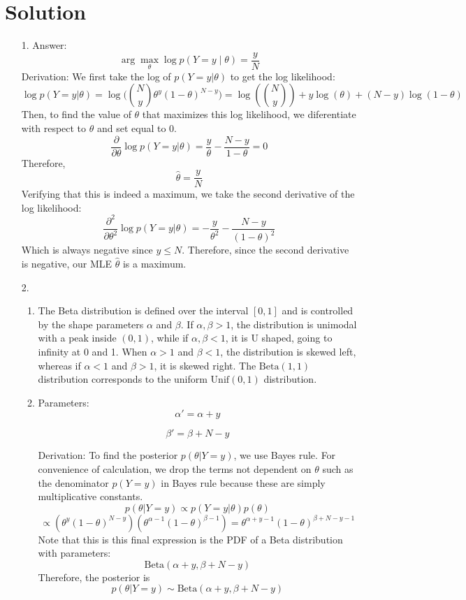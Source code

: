 \documentclass[submit]{../harvardml}
\newenvironment{answer}
  {\section*{Solution}}
{}
\begin{document}
\begin{answer}
  \begin{enumerate}
    \item[1.]
      Answer:
      \[
        \arg \max_{\theta} \log p(Y = y \mid \theta) = \frac{y}{N}
      \]
      Derivation: We first take the log of $p(Y = y | \theta)$ to get the log likelihood:
      $$\log p(Y = y | \theta) = \log\biggr({N \choose y} \theta^{y} (1-\theta)^{N-y}\biggr) = \log({N \choose y}) + y \log(\theta) + (N - y) \log ( 1- \theta)$$
      Then, to find the value of $\theta$ that maximizes this log likelihood, we diferentiate with respect to $\theta$ and set equal to $0$.
      $$\frac{\partial}{\partial \theta} \log p(Y = y | \theta) = \frac{y}{\theta} - \frac{N-y}{1-\theta} = 0$$
      Therefore, 
      $$\hat\theta = \frac{y}{N}$$
      Verifying that this is indeed a maximum, we take the second derivative of the log likelihood:
      $$\frac{\partial^2}{\partial \theta^2} \log p(Y = y | \theta) = -\frac{y}{\theta^2} - \frac{N-y}{(1-\theta)^2}$$
      Which is always negative since $y \leq N$. Therefore, since the second derivative is negative, our MLE $\hat\theta$ is a maximum.
    \item[2.]
      \begin{enumerate}
        \item
        The Beta distribution is defined over the interval $[0,1]$ and is controlled by the shape parameters $\alpha$ and $\beta$. If $\alpha, \beta > 1$, the distribution is unimodal with a peak inside $(0,1)$, while if $\alpha, \beta < 1$, it is U shaped, going to infinity at 0 and 1. When $\alpha > 1$ and $\beta < 1$, the distribution is skewed left, whereas if $\alpha < 1$ and $\beta > 1$, it is skewed right. The $\text{Beta}(1,1)$ distribution corresponds to the uniform $\text{Unif}(0,1)$ distribution.

        \item

              Parameters:
              \[
                \alpha' = \alpha + y
              \]

              \[
                \beta' = \beta + N - y
              \]

              Derivation: To find the posterior $p(\theta| Y = y)$, we use Bayes rule. For convenience of calculation, we drop the terms not dependent on $\theta$ such as the denominator $p(Y = y)$ in Bayes rule because these are simply multiplicative constants.
              $$p(\theta | Y = y) \propto p(Y = y|\theta) p(\theta)$$
              $$ \propto (\theta^{y} (1- \theta)^{N - y})  (\theta^{\alpha - 1} (1- \theta)^{\beta - 1}) = \theta^{\alpha + y - 1} (1- \theta)^{\beta + N - y - 1}$$
              Note that this is this final expression is the PDF of a Beta distribution with parameters:
              $$\text{Beta}(\alpha + y, \beta + N - y)$$
              Therefore, the posterior is
              $$p(\theta | Y =y) \sim \text{Beta}(\alpha + y, \beta + N - y)$$


\end{enumerate}
\end{enumerate}
\end{answer}
\end{document}
